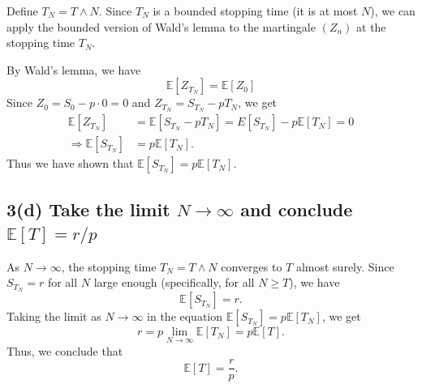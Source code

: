 \documentclass[answers,12pt,addpoints]{exam}
\begin{document}
Define $T_N = T \wedge N$.
Since $T_N$ is a bounded stopping time (it is at most $N$), we can apply the bounded version of Wald's lemma to the martingale $(Z_n)$ at the stopping time $T_N$.

By Wald's lemma, we have
$$
\mathbb{E}[Z_{T_N}] = \mathbb{E}[Z_0] 
$$
Since $Z_0 = S_0 - p \cdot 0 = 0$ and $Z_{T_N} = S_{T_N} - p T_N$, we get
\begin{align*}
    \mathbb{E}[Z_{T_N}] &= \mathbb{E}[S_{T_N} - p T_N] = E[S_{T_N}] - p \mathbb{E}[T_N] = 0 \\
    \Rightarrow \mathbb{E}[S_{T_N}] &= p \mathbb{E}[T_N].
\end{align*}
Thus we have shown that $\mathbb{E}[S_{T_N}] = p \mathbb{E}[T_N]$.

\subsection*{3(d) Take the limit \texorpdfstring{$N \to \infty$}{N to infty} and conclude \texorpdfstring{$\mathbb{E}[T] = r/p$}{E[T]=r/p}}

As $N \to \infty$, the stopping time $T_N = T \wedge N$ converges to $T$ almost surely. Since $S_{T_N} = r$ for all $N$ large enough (specifically, for all $N \geq T$), we have
$$
\mathbb{E}[S_{T_N}] = r.
$$
Taking the limit as $N \to \infty$ in the equation $\mathbb{E}[S_{T_N}] = p \mathbb{E}[T_N]$, we get
$$
r = p \lim_{N \to \infty} \mathbb{E}[T_N] = p \mathbb{E}[T].
$$
Thus, we conclude that
$$
\mathbb{E}[T] = \frac{r}{p}.
$$
\end{document}
